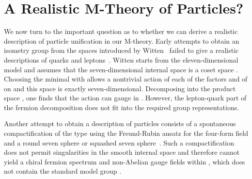 \documentclass[a4paper,12pt]{article}
\begin{document}
\section{\bf A Realistic M-Theory of Particles?}

We now turn to the important question as to whether we can derive a
realistic description of particle unification in our M-theory.
Early attempts to obtain an isometry group from the \coordHE{}
spaces introduced by Witten~\cite{Witten4} failed to give a
realistic descriptions of quarks and leptons~\cite{Duff2}.
Witten starts from the eleven-dimensional model and assumes that
the seven-dimensional internal space is a coset space \coordHE{}.
Choosing the minimal \coordHE{} with \coordHE{}
allows a nontrivial action of each of the factors \coordHE{}
and \coordHE{} of \coordHE{} on \coordHE{} and this space is exactly
seven-dimensional. Decomposing \coordHE{} into the product
space \coordHE{}, one finds that the action can gauge
\coordHE{} in \coordHE{}. However, the
lepton-quark part of the fermion decomposition does not fit into
the required \coordHE{} group
representations.

Another attempt to obtain a description of particles consists of a spontaneous
compactification of the type using the Freund-Rubin ansatz for
the four-form field \coordHE{} and a round seven sphere \coordHE{} or
squashed seven sphere~\cite{Englert}. Such a compactification
does not permit singularities in the smooth internal space \coordHE{} and therefore cannot
yield a chiral fermion spectrum and non-Abelian gauge fields within \coordHE{}, which
does not contain the standard model group \coordHE{}.
\end{document}
